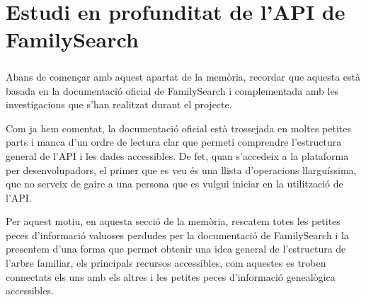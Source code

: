 \chapter{Estudi en profunditat de l'API de FamilySearch}

    \paragraph{}
    Abans de començar amb aquest apartat de la memòria, recordar que aquesta està basada en la documentació oficial de FamilySearch i complementada amb les investigacions que s'han realitzat durant el projecte.

    Com ja hem comentat, la documentació oficial està trossejada en moltes petites parts i manca d'un ordre de lectura clar que permeti comprendre l'estructura general de l'API i les dades accessibles. De fet, quan s'accedeix a la plataforma per desenvolupadors, el primer que es veu és una llista d'operacions llarguíssima, que no serveix de gaire a una persona que es vulgui iniciar en la utilització de l'API.

    Per aquest motiu, en aquesta secció de la memòria, rescatem totes les petites peces d'informació valuoses perdudes per la documentació de FamilySearch i la presentem d'una forma que permet obtenir una idea general de l'estructura de l'arbre familiar, els principals recursos accessibles, com aquestes es troben connectats els uns amb els altres i les petites peces d'informació genealògica accessibles.

    
    
    
    
    
    
    
    
    
    
